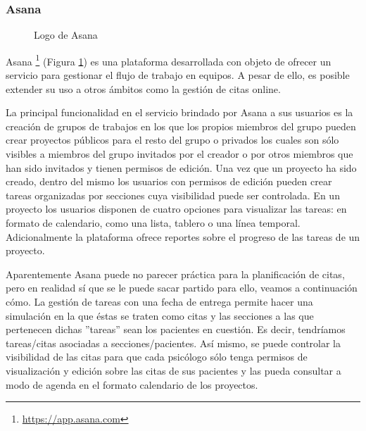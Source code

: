 \subsubsection*{Asana}
\begin{figure}[H]
    \caption{Logo de Asana}
    \label{fig:logo-asana}
\end{figure}

Asana \footnote{\url{https://app.asana.com}} (Figura \ref{fig:logo-asana}) es una plataforma desarrollada con objeto de ofrecer un servicio para gestionar el flujo de trabajo en equipos. A pesar de ello, es posible extender su uso a otros ámbitos como la gestión de citas online. \bigskip

La principal funcionalidad en el servicio brindado por Asana a sus usuarios es la creación de grupos de trabajos en los que los propios miembros del grupo pueden crear proyectos públicos para el resto del grupo o privados los cuales son sólo visibles a miembros del grupo invitados por el creador o por otros miembros que han sido invitados y tienen permisos de edición. Una vez que un proyecto ha sido creado, dentro del mismo los usuarios con permisos de edición pueden crear tareas organizadas por secciones cuya visibilidad puede ser controlada. En un proyecto los usuarios disponen de cuatro opciones para visualizar las tareas: en formato de calendario, como una lista, tablero o una línea temporal. Adicionalmente la plataforma ofrece reportes sobre el progreso de las tareas de un proyecto. \bigskip

Aparentemente Asana puede no parecer práctica para la planificación de citas, pero en realidad sí que se le puede sacar partido para ello, veamos a continuación cómo. La gestión de tareas con una fecha de entrega permite hacer una simulación en la que éstas se traten como citas y las secciones a las que pertenecen dichas ''tareas'' sean los pacientes en cuestión. Es decir, tendríamos tareas/citas asociadas a secciones/pacientes. Así mismo, se puede controlar la visibilidad de las citas para que cada psicólogo sólo tenga permisos de visualización y edición sobre las citas de sus pacientes y las pueda consultar a modo de agenda en el formato calendario de los proyectos. \bigskip

